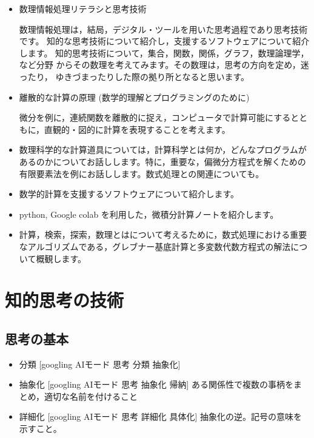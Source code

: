 \documentclass[dvipdfmx,11pat]{jarticle}
\begin{document}
\begin{itemize}
\item 数理情報処理リテラシと思考技術

数理情報処理は，結局，デジタル・ツールを用いた思考過程であり思考技術です。
知的な思考技術について紹介し，支援するソフトウェアについて紹介します。
知的思考技術について，集合，関数，関係，グラフ，数理論理学，など分野
からその数理を考えてみます。その数理は，思考の方向を定め，迷ったり，
ゆきづまったりした際の拠り所となると思います。

\item 離散的な計算の原理 (数学的理解とプログラミングのために)

微分を例に，連続関数を離散的に捉え，コンピュータで計算可能にするとと
もに，直観的・図的に計算を表現することを考えます。

\item 数理科学的な計算道具については，計算科学とは何か，どんなプログラムが
あるのかについてお話しします。特に，重要な，偏微分方程式を解くための
有限要素法を例にお話しします。数式処理との関連についても。

\item 数学的計算を支援するソフトウェアについて紹介します。

\item python, Google colab を利用した，微積分計算ノートを紹介します。

\item 計算，検索，探索，数理とはについて考えるために，数式処理における重要
なアルゴリズムである，グレブナー基底計算と多変数代数方程式の解法につ
いて概観します。
\end{itemize}
\section{知的思考の技術}
\label{sec:org16abac1}
\subsection{思考の基本}
\label{sec:org81cd516}
\begin{itemize}
\item 分類 [googling AIモード 思考 分類 抽象化]

\item 抽象化 [googling AIモード 思考 抽象化 帰納]
ある関係性で複数の事柄をまとめ，適切な名前を付けること

\item 詳細化 [googling AIモード 思考 詳細化  具体化]
抽象化の逆。記号の意味を示すこと。
\end{itemize}
\end{document}
